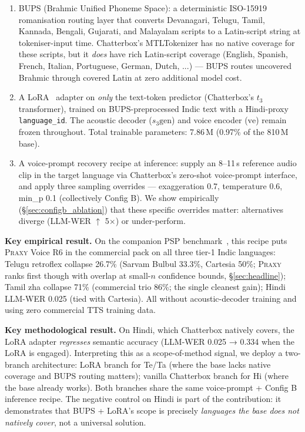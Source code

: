 \documentclass[conference,a4paper]{IEEEtran}
\newcommand{\psp}{\textsc{PSP}}
\newcommand{\praxy}{\textsc{Praxy}}
\newcommand{\bups}{\textsc{BUPS}}
\newcommand{\configb}{Config B}
\begin{document}
\begin{enumerate}
  \item \bups{} (Brahmic Unified Phoneme Space): a deterministic ISO-15919~\cite{iso15919} romanisation routing layer that converts Devanagari, Telugu, Tamil, Kannada, Bengali, Gujarati, and Malayalam scripts to a Latin-script string at tokeniser-input time. Chatterbox's MTLTokenizer has no native coverage for these scripts, but it \emph{does} have rich Latin-script coverage (English, Spanish, French, Italian, Portuguese, German, Dutch, ...) --- \bups{} routes uncovered Brahmic through covered Latin at zero additional model cost.
  \item A LoRA~\cite{hu2021lora} adapter on \emph{only} the text-token predictor (Chatterbox's $t_3$ transformer), trained on BUPS-preprocessed Indic text with a Hindi-proxy \texttt{language\_id}. The acoustic decoder ($s_3\text{gen}$) and voice encoder ($\text{ve}$) remain frozen throughout. Total trainable parameters: 7.86\,M (0.97\% of the 810\,M base).
  \item A voice-prompt recovery recipe at inference: supply an 8--11\,s reference audio clip in the target language via Chatterbox's zero-shot voice-prompt interface, and apply three sampling overrides --- exaggeration 0.7, temperature 0.6, min\_p 0.1 (collectively \configb). We show empirically (§\ref{sec:configb_ablation}) that these specific overrides matter: alternatives diverge (LLM-WER $\uparrow$ 5$\times$) or under-perform.
\end{enumerate}

\textbf{Key empirical result.} On the companion \psp{} benchmark~\cite{psp2026}, this recipe puts \praxy{} Voice R6 in the commercial pack on all three tier-1 Indic languages: Telugu retroflex collapse 26.7\% (Sarvam Bulbul 33.3\%, Cartesia 50\%; \praxy{} ranks first though with overlap at small-$n$ confidence bounds, §\ref{sec:headline}); Tamil zha collapse 71\% (commercial trio 86\%; the single cleanest gain); Hindi LLM-WER 0.025 (tied with Cartesia). All without acoustic-decoder training and using zero commercial TTS training data.

\textbf{Key methodological result.} On Hindi, which Chatterbox natively covers, the LoRA adapter \emph{regresses} semantic accuracy (LLM-WER 0.025 → 0.334 when the LoRA is engaged). Interpreting this as a scope-of-method signal, we deploy a two-branch architecture: LoRA branch for Te/Ta (where the base lacks native coverage and \bups{} routing matters); vanilla Chatterbox branch for Hi (where the base already works). Both branches share the same voice-prompt + \configb{} inference recipe. The negative control on Hindi is part of the contribution: it demonstrates that \bups{} + LoRA's scope is precisely \emph{languages the base does not natively cover}, not a universal solution.
\end{document}
